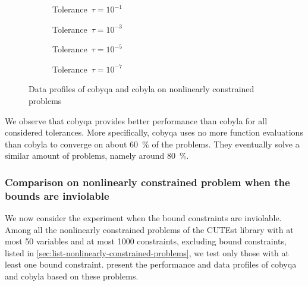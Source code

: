 \begin{figure}[ht]
    \centering
    \begin{subfigure}[b]{0.49\textwidth}
        \centering
        \caption{Tolerance~$\tau = 10^{-1}$}
    \end{subfigure}
    \hfill
    \begin{subfigure}[b]{0.49\textwidth}
        \centering
        \caption{Tolerance~$\tau = 10^{-3}$}
    \end{subfigure}
    \begin{subfigure}[b]{0.49\textwidth}
        \centering
        \caption{Tolerance~$\tau = 10^{-5}$}
    \end{subfigure}
    \hfill
    \begin{subfigure}[b]{0.49\textwidth}
        \centering
        \caption{Tolerance~$\tau = 10^{-7}$}
    \end{subfigure}
    \caption[Data profiles on nonlinearly constrained problems]{Data profiles of \gls{cobyqa} and \gls{cobyla} on nonlinearly constrained problems}
    \label{fig:data-nonlinearly-constrained-problems}
\end{figure}

We observe that \gls{cobyqa} provides better performance than \gls{cobyla} for all considered tolerances.
More specifically, \gls{cobyqa} uses no more function evaluations than \gls{cobyla} to converge on about \SI{60}{\percent} of the problems.
They eventually solve a similar amount of problems, namely around \SI{80}{\percent}.

\subsubsection{Comparison on nonlinearly constrained problem when the bounds are inviolable}

We now consider the experiment when the bound constraints are inviolable.
Among all the nonlinearly constrained problems of the CUTEst library with at most \num{50} variables and at most \num[group-minimum-digits=4]{1000} constraints, excluding bound constraints, listed in \cref{sec:list-nonlinearly-constrained-problems}, we test only those with at least one bound constraint.
 present the performance and data profiles of \gls{cobyqa} and \gls{cobyla} based on these problems.

